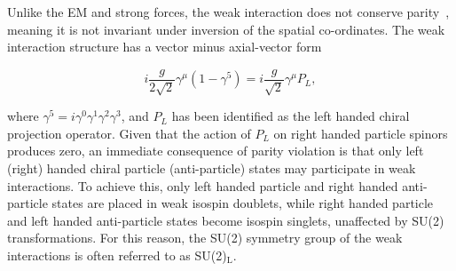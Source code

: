 Unlike the EM and strong forces, the weak interaction does not conserve parity~\cite{ParityViolation}, meaning it is not invariant under inversion of the spatial co-ordinates. The weak interaction structure has a vector minus axial-vector form %

\begin{equation}
    i\frac{g}{2\sqrt{2}} \gamma^{\mu}(1-\gamma^{5})  = i\frac{g}{\sqrt{2}} \gamma^{\mu}P_{L},
\end{equation}

\noindent where ${\gamma^{5}=i\gamma^{0}\gamma^{1}\gamma^{2}\gamma^{3}}$, and ${P_{L}}$ has been identified as the left handed chiral projection operator. Given that the action of ${P_{L}}$ on right handed particle spinors produces zero, an immediate consequence of parity violation is that only left (right) handed chiral particle (anti-particle) states may participate in weak interactions. To achieve this, only left handed particle and right handed anti-particle states are placed in weak isospin doublets, while right handed particle and left handed anti-particle states become isospin singlets, unaffected by SU(2) transformations. For this reason, the SU(2) symmetry group of the weak interactions is often referred to as SU(2)${_{\mathrm{L}}}$. %

